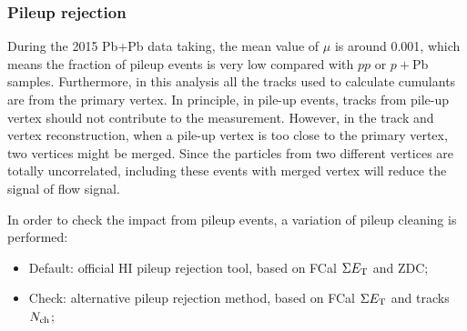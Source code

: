 \subsubsection{Pileup rejection}
\label{sec:pileup_rejection}

During the 2015 Pb+Pb data taking, the mean value of $\mu$ is around 0.001, which means the fraction of pileup events is very low compared with $pp$ or $p+$Pb samples. Furthermore, in this analysis all the tracks used to calculate cumulants are from the primary vertex. In principle, in pile-up events, tracks from pile-up vertex should not contribute to the measurement. However, in the track and vertex reconstruction, when a pile-up vertex is too close to the primary vertex, two vertices might be merged. Since the particles from two different vertices are totally uncorrelated, including these events with merged vertex will reduce the signal of flow signal.

In order to check the impact from pileup events, a variation of pileup cleaning is performed:
\begin{itemize}
\item Default: official HI pileup rejection tool, based on FCal $\Sigma E_\text{T}$ and ZDC;
\item Check: alternative pileup rejection method, based on FCal $\Sigma E_\text{T}$ and tracks $N_\text{ch}$;
\end{itemize}

